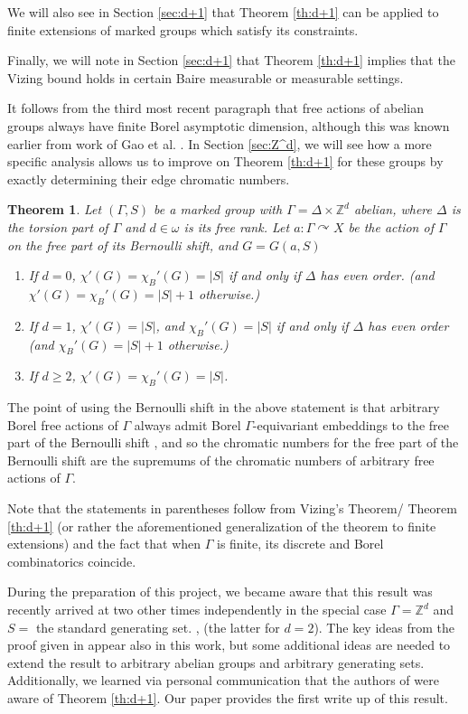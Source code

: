 \documentclass[12pt]{article}
\newcommand{\0}{\varnothing}
\newcommand{\Z}{\mathbb{Z}}
\newtheorem{theorem}{Theorem}
\begin{document}
We will also see in Section \ref{sec:d+1} that Theorem \ref{th:d+1} can be applied to finite extensions of marked groups which satisfy its constraints.

Finally, we will note in Section \ref{sec:d+1} that Theorem \ref{th:d+1} implies that the Vizing bound holds in certain Baire measurable or measurable settings.

It follows from the third most recent paragraph that free actions of abelian groups always have finite Borel asymptotic dimension, although this was known earlier from work of Gao et al. \cite{toast}. In Section \ref{sec:Z^d}, we will see how a more specific analysis allows us to improve on Theorem \ref{th:d+1} for these groups by exactly determining their edge chromatic numbers.

\begin{theorem}\label{th:Z^d}
Let $(\Gamma,S)$ be a marked group with $\Gamma = \Delta \times \Z^d$ abelian, where $\Delta$ is the torsion part of $\Gamma$ and $d \in \omega$ is its free rank. Let $a:\Gamma \curvearrowright X$ be the action of $\Gamma$ on the free part of its Bernoulli shift, and $G = G(a,S)$
\begin{enumerate}
    \item If $d = 0$, $\chi'(G) = \chi_B'(G) = |S|$ if and only if $\Delta$ has even order. (and $\chi'(G) = \chi_B'(G) = |S|+1$ otherwise.)
    \item If $d = 1$, $\chi'(G) = |S|$, and $\chi_B'(G) = |S|$ if and only if $\Delta$ has even order (and $\chi_B'(G) = |S|+1$ otherwise.)
    \item If $d \geq 2$, $\chi'(G) = \chi_B'(G) = |S|$.
\end{enumerate}
\end{theorem}

The point of using the Bernoulli shift in the above statement is that arbitrary Borel free actions of $\Gamma$ always admit Borel $\Gamma$-equivariant embeddings to the free part of the Bernoulli shift \cite{JKL}, and so the chromatic numbers for the free part of the Bernoulli shift are the supremums of the chromatic numbers of arbitrary free actions of $\Gamma$.

Note that the statements in parentheses follow from Vizing's Theorem/ Theorem \ref{th:d+1} (or rather the aforementioned generalization of the theorem to finite extensions)  and the fact that when $\Gamma$ is finite, its discrete and Borel combinatorics coincide. 

During the preparation of this project, we became aware that this result was recently arrived at two other times independently in the special case $\Gamma = \Z^d$ and $S =$ the standard generating set. \cite{GR},\cite{BHT} (the latter for $d = 2$). The key ideas from the proof given in \cite{GR} appear also in this work, but some additional ideas are needed to extend the result to arbitrary abelian groups and arbitrary generating sets. Additionally, we learned via personal communication that the authors of \cite{GR} were aware of Theorem \ref{th:d+1}. Our paper provides the first write up of this result. 
\end{document}
